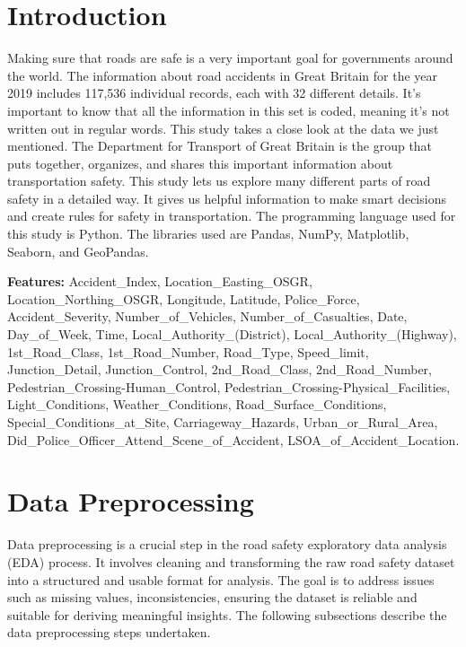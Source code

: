 \documentclass{article}
\begin{document}
\section{Introduction}
Making sure that roads are safe is a very important goal for governments around the world. The information about
road accidents in Great Britain for the year 2019 includes 117,536 individual records, each with 32 different
details. It's important to know that all the information in this set is coded, meaning it's not written out in
regular words.
This study takes a close look at the data we just mentioned. The Department for Transport of Great Britain is the
group that puts together, organizes, and shares this important information about transportation safety.
This study lets us explore many different parts of road safety in a detailed way. It gives us helpful information
to make smart decisions and create rules for safety in transportation.
The programming language used for this study is Python. The libraries used are Pandas, NumPy, Matplotlib, Seaborn,
and GeoPandas.

\textbf{Features:}
Accident\_Index, Location\_Easting\_OSGR, Location\_Northing\_OSGR, Longitude, Latitude,
Police\_Force, Accident\_Severity, Number\_of\_Vehicles, Number\_of\_Casualties, Date,
Day\_of\_Week, Time, Local\_Authority\_(District), Local\_Authority\_(Highway), 1st\_Road\_Class,
1st\_Road\_Number, Road\_Type, Speed\_limit, Junction\_Detail, Junction\_Control, 2nd\_Road\_Class,
2nd\_Road\_Number, Pedestrian\_Crossing-Human\_Control, Pedestrian\_Crossing-Physical\_Facilities,
Light\_Conditions, Weather\_Conditions, Road\_Surface\_Conditions, Special\_Conditions\_at\_Site,
Carriageway\_Hazards, Urban\_or\_Rural\_Area, Did\_Police\_Officer\_Attend\_Scene\_of\_Accident,
LSOA\_of\_Accident\_Location.

\section{Data Preprocessing}
Data preprocessing is a crucial step in the road safety exploratory data analysis (EDA) process. It involves
cleaning and transforming the raw road safety dataset into a structured and usable format for analysis. The
goal is to address issues such as missing values, inconsistencies, ensuring the dataset is reliable and suitable
for deriving meaningful insights. The following subsections describe the data preprocessing steps undertaken.
\end{document}
